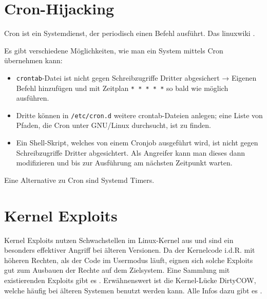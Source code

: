 \documentclass[
    parskip=half,
    landscape
]{scrartcl}
\providecommand{\tightlist}{%
   \setlength{\itemsep}{0pt}\setlength{\parskip}{0pt}}
\let\originalhref\href
\renewcommand\href[2]{\originalhref{#1}{\color{blue}{#2}}}%
\begin{document}
\begin{multicols}{3}
\section{Cron-Hijacking}

Cron ist ein Systemdienst, der periodisch einen Befehl ausführt. Das
linuxwiki \href{https://www.linuxwiki.de/crontab}{bietet einen guten
Überblick über die Funktionsweise}.

Es gibt verschiedene Möglichkeiten, wie man ein System mittels Cron
übernehmen kann:

\begin{itemize}
\item
  \texttt{crontab}-Datei ist nicht gegen Schreibzugriffe Dritter
  abgesichert → Eigenen Befehl hinzufügen und mit Zeitplan \texttt{* * * * *} so
  bald wie möglich ausführen.
\item
  Dritte können in \texttt{/etc/cron.d} weitere crontab-Dateien anlegen;
  eine Liste von Pfaden, die Cron unter GNU/Linux durchsucht, ist
  \href{https://github.com/swisskyrepo/PayloadsAllTheThings/blob/master/Methodology\%20and\%20Resources/Linux\%20-\%20Privilege\%20Escalation.md\#cron-jobs}{hier}
  zu finden.
\item
  Ein Shell-Skript, welches von einem Cronjob ausgeführt wird, ist nicht
  gegen Schreibzugriffe Dritter abgesichtert. Als Angreifer kann man
  dieses dann modifizieren und bis zur Ausführung am nächsten Zeitpunkt
  warten.
\end{itemize}
Eine Alternative zu Cron sind Systemd Timers.



\section{Kernel Exploits}

Kernel Exploits nutzen Schwachstellen im Linux-Kernel aus und sind ein besonders effektiver Angriff bei älteren Versionen.
Da der Kernelcode i.d.R. mit höheren Rechten, als der Code im Usermodus läuft, eignen sich solche Exploits gut zum Ausbauen der Rechte auf dem Zielsystem.
Eine Sammlung mit existierenden Exploits gibt es
\href{https://github.com/xairy/linux-kernel-exploitation\#exploits}{hier}.
%
Erwähnenswert ist die Kernel-Lücke DirtyCOW, welche häufig bei älteren Systemen benutzt werden kann.
Alle Infos dazu gibt es \href{https://dirtycow.ninja/}{auf der offiziellen Website}.


\end{multicols}
\end{document}
